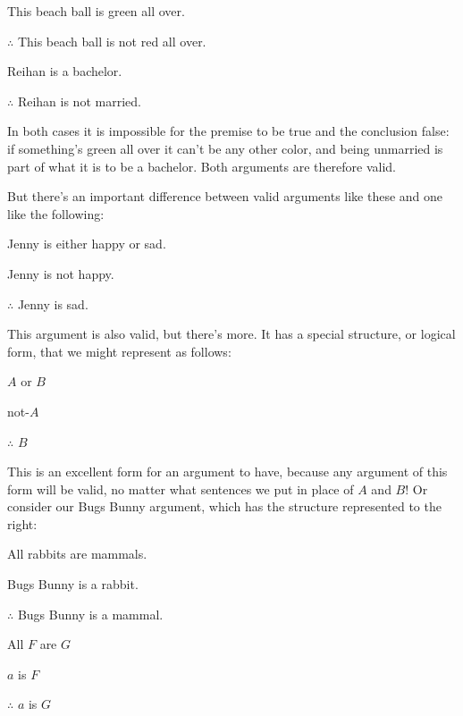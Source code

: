 	\begin{earg}
		\item[\ex{exarg5}] This beach ball is green all over.
		\item[] $\therefore$ This beach ball is not red all over. 
	\end{earg}
	
	\begin{earg}
		\item[\ex{exarg6}]  Reihan is a bachelor.
		\item[] $\therefore$ Reihan is not married.
	\end{earg}	
In both cases it is impossible for the premise to be true and the conclusion false: if something's green all over it can't be any other color, and being unmarried is part of what it is to be a bachelor.  Both arguments are therefore valid. 

But there's an important difference between valid arguments like these and one like the following:

	\begin{earg}
		\item[\ex{exarg8}] Jenny is either happy or sad.
		\item[] Jenny is not happy.
		\item[] $\therefore$ Jenny is sad.
	\end{earg}

\noindent This argument is also valid, but there's more.  It has a special structure, or logical form, that we might represent as follows:


	\begin{earg}
		\item[] $A$ or $B$
		\item[] not-$A$
		\item[] $\therefore$ $B$
	\end{earg}

\noindent This is an excellent form for an argument to have, because any argument of this form will be valid, no matter what sentences we put in place of $A$ and $B$! Or consider our Bugs Bunny argument, which has the structure represented to the right:



\begin{multicols}{2}
	
\begin{earg}
\item[\eref{exarg1}]All rabbits are mammals.
\item[] Bugs Bunny is a rabbit.
\item[] $\therefore$ Bugs Bunny is a mammal.
\end{earg}
	
\columnbreak

\begin{earg}
	\item[] All $F$ are $G$
	\item[] $a$ is $F$
	\item[] $\therefore$ $a$ is $G$
\end{earg}

\end{multicols}



